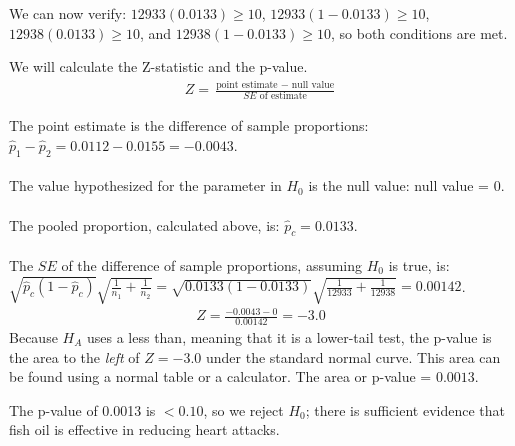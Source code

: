 \begin{examplewrap}
\begin{nexample}
\begin{description}
We can now verify: $12933(0.0133)\geq10$, $12933(1-0.0133)\geq10$, $12938(0.0133)\geq10$, and $12938(1-0.0133)\geq10$,  so both conditions are met. 
\item[ \inferencestep{Calculate} ]  We will calculate the Z-statistic and the p-value.
\begin{align*}
Z = \frac{\text{point estimate } - \text{ null value}}{SE \text{ of estimate}}
\end{align*}

The point estimate is the difference of sample proportions: $\hat{p}_1-\hat{p}_2 = 0.0112 - 0.0155 = -0.0043.$\\
\\
The value hypothesized for the parameter in $H_0$ is the null value:  null value = 0.\\
\\
The pooled proportion, calculated above, is: $\hat{p}_c = 0.0133$.
\\
\\
The $SE$ of the difference of sample proportions, assuming $H_0$ is true, is: \\ $\sqrt{\hat{p}_c(1-\hat{p}_c)}\sqrt{\frac{1}{n_1} + \frac{1}{n_2}} = \sqrt{0.0133(1-0.0133)}\sqrt{\frac{1}{12933} + \frac{1}{12938}}=0.00142$. \\
\begin{align*}
Z = \frac{-0.0043 - 0}{0.00142} = -3.0
\end{align*}
Because $H_A$ uses a less than, meaning that it is a lower-tail test, the \mbox{p-value} is the area to the \emph{left} of $Z=-3.0$ under the standard normal curve.  This area can be found using a normal table or a calculator.  The area or p-value = $0.0013$.  
\item[\inferencestep{Conclude}]  The p-value of 0.0013 is $< 0.10$, so we reject $H_0$; there is sufficient evidence that fish oil is effective in reducing heart attacks.  
\end{description}
\end{nexample}
\end{examplewrap}


\D{\newpage}

